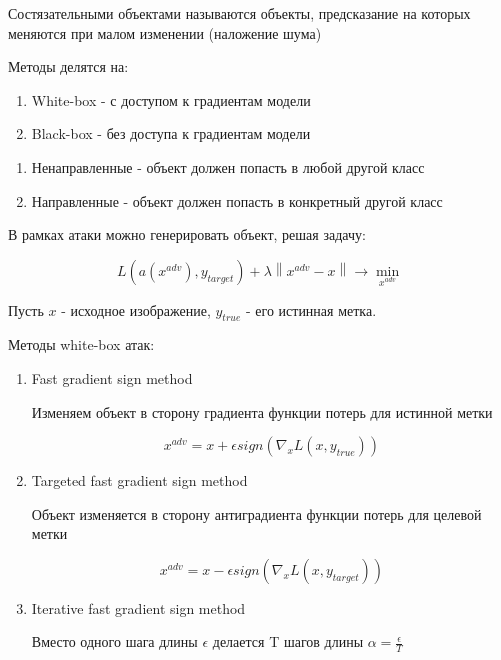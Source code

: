 \documentclass[a4paper, 12pt]{article}
\newcommand\norm[1]{\left\lVert#1\right\rVert}
\begin{document}
Состязательными объектами называются объекты,
предсказание на которых меняются при малом изменении (наложение шума)

Методы делятся на:

\begin{enumerate}
    \item White-box - с доступом к градиентам модели
    \item Black-box - без доступа к градиентам модели
\end{enumerate}

\begin{enumerate}
    \item Ненаправленные - объект должен попасть в любой другой класс
    \item Направленные - объект должен попасть в конкретный другой класс
\end{enumerate}

В рамках атаки можно генерировать объект, решая задачу:

\[L(a(x^{adv}), y_{target}) + \lambda \norm{x^{adv} - x} \rightarrow \min_{x^{adv}}\]

Пусть $x$ - исходное изображение, $y_{true}$ - его истинная метка.

Методы white-box атак:

\begin{enumerate}
    \item Fast gradient sign method
    
    Изменяем объект в сторону градиента функции потерь для истинной метки

    \[x^{adv} = x + \epsilon sign(\nabla_x L(x, y_{true}))\]

    \item Targeted fast gradient sign method
    
    Объект изменяется в сторону антиградиента функции потерь для целевой метки

    \[x^{adv} = x - \epsilon sign(\nabla_x L(x, y_{target}))\]

    \item Iterative fast gradient sign method
    
    Вместо одного шага длины $\epsilon$ делается T шагов длины 
    $\alpha = \frac{\epsilon}{T}$
\end{enumerate}
\end{document}
